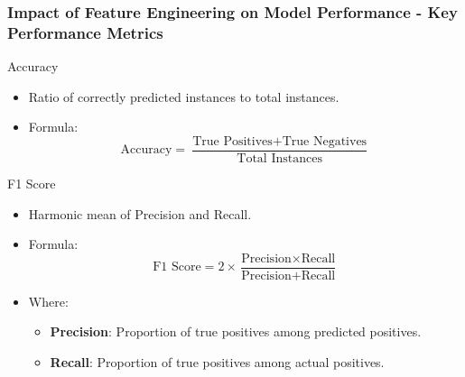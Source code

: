 \documentclass[aspectratio=169]{beamer}
\begin{document}
\begin{frame}[fragile]
    \frametitle{Impact of Feature Engineering on Model Performance - Key Performance Metrics}
    \begin{block}{Accuracy}
        \begin{itemize}
            \item Ratio of correctly predicted instances to total instances.
            \item Formula: 
            \[
            \text{Accuracy} = \frac{\text{True Positives} + \text{True Negatives}}{\text{Total Instances}}
            \]
        \end{itemize}
    \end{block}
    
    \begin{block}{F1 Score}
        \begin{itemize}
            \item Harmonic mean of Precision and Recall.
            \item Formula: 
            \[
            \text{F1 Score} = 2 \times \frac{\text{Precision} \times \text{Recall}}{\text{Precision} + \text{Recall}}
            \]
            \item Where:
            \begin{itemize}
                \item \textbf{Precision}: Proportion of true positives among predicted positives.
                \item \textbf{Recall}: Proportion of true positives among actual positives.
            \end{itemize}
        \end{itemize}
    \end{block}
\end{frame}
\end{document}
